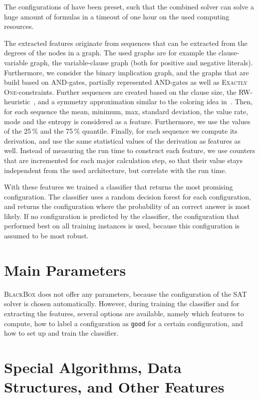 \documentclass[conference]{IEEEtran}
\begin{document}
The configurations of \riss have been preset, such that the combined solver can solve a huge amount of formulas in a timeout of one hour on the used computing resources. 

The extracted features originate from sequences that can be extracted from the degrees of the nodes in a graph. 
The used graphs are for example the clause-variable graph, the variable-clause graph (both for positive and negative literals). 
Furthermore, we consider the binary implication graph, and the graphs that are build based on \textsc{AND}-gates, partially represented \textsc{AND}-gates as well as \textsc{Exactly One}-constraints. 
Further sequences are created based on the clause size, the \textsc{RW}-heuristic~\cite{march10-ahmed,AF10-ahmed}, and a symmetry approximation similar to the coloring idea in~\cite{AloulRMS:2002}. 
Then, for each sequence the mean, minimum, max, standard deviation, the value rate, mode and the entropy is considered as a feature. 
Furthermore, we use the values of the 25\,\% and the 75\,\% quantile. 
Finally, for each sequence we compute its derivation, and use the same statistical values of the derivation as features as well. 
Instead of measuring the run time to construct each feature, we use counters that are incremented for each major calculation step, so that their value stays independent from the used architecture, but correlate with the run time. 

With these features we trained a classifier that returns the most promising configuration. 
The classifier uses a random decision forest for each configuration, and returns the configuration where the probability of an correct answer is most likely. 
If no configuration is predicted by the classifier, the configuration that performed best on all training instances is used, because this configuration is assumed to be most robust. 

\section{Main Parameters}

\riss \textsc{BlackBox} does not offer any parameters, because the configuration of the SAT solver is chosen automatically. 
However, during training the classifier and for extracting the features, several options are available, namely which features to compute, how to label a configuration as \texttt{good} for a certain configuration, and how to set up and train the classifier.

\section{Special Algorithms, Data Structures, and Other Features}
\end{document}
